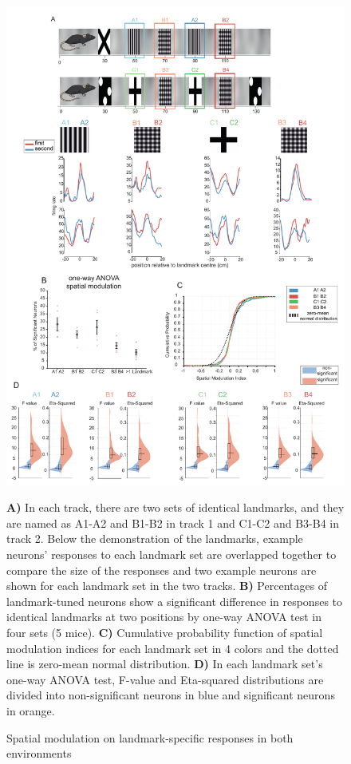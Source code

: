 \begin{figure}
    \centering
    \includegraphics[width=1\linewidth]{figures//Chapter 4 V1/fig3_spatial_modulation_intro.pdf}
    \caption{Spatial modulation on landmark-specific responses in both environments}
\medskip
\small
\textbf{A)} In each track, there are two sets of identical landmarks, and they are named as A1-A2 and B1-B2 in track 1 and C1-C2 and B3-B4 in track 2. Below the demonstration of the landmarks, example neurons' responses to each landmark set are overlapped together to compare the size of the responses and two example neurons are shown for each landmark set in the two tracks. \textbf{B)} Percentages of landmark-tuned neurons show a significant difference in responses to identical landmarks at two positions by one-way ANOVA test in four sets (5 mice). \textbf{C)} Cumulative probability function of spatial modulation indices for each landmark set in 4 colors and the dotted line is zero-mean normal distribution. \textbf{D)} In each landmark set's one-way ANOVA test, F-value and Eta-squared distributions are divided into non-significant neurons in blue and significant neurons in orange.
    
    \label{fig:placeholder}
\end{figure}

